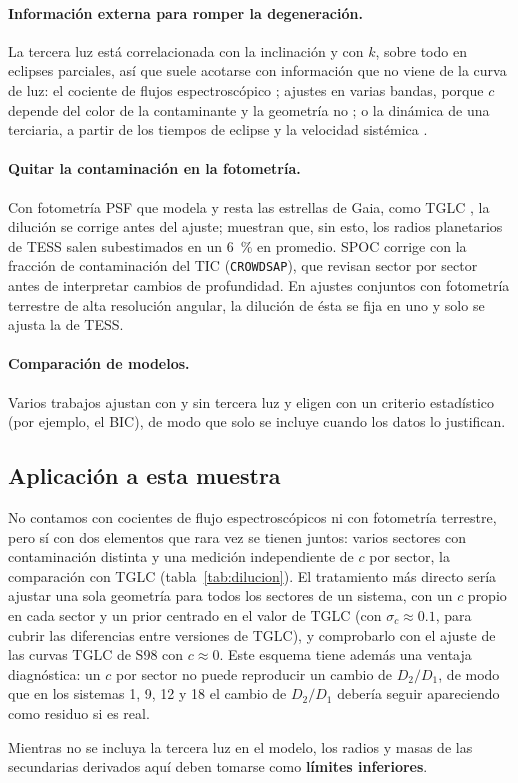 \paragraph{Información externa para romper la degeneración.} La tercera luz está correlacionada con la
inclinación y con $k$, sobre todo en eclipses parciales, así que suele acotarse con información que no viene
de la curva de luz: el cociente de flujos espectroscópico \citep{David2016}; ajustes en varias bandas, porque
$c$ depende del color de la contaminante y la geometría no \citep[en Orión,][ajustan $\ell_3$ por banda y obtienen
$\ell_3=0.31$ en TESS para nuestro sistema~6]{KounkelStassun2024}; o la dinámica de una terciaria, a partir de los
tiempos de eclipse y la velocidad sistémica \citep{GomezMaqueoChew2019}.

\paragraph{Quitar la contaminación en la fotometría.} Con fotometría PSF que modela y resta las estrellas de
Gaia, como TGLC \citep{HanBrandt2023}, la dilución se corrige antes del ajuste; \citet{Han2025} muestran que, sin
esto, los radios planetarios de TESS salen subestimados en un 6~\% en promedio. SPOC corrige con la fracción de
contaminación del TIC (\texttt{CROWDSAP}), que \citet{Baum2025} revisan sector por sector antes de interpretar
cambios de profundidad. En ajustes conjuntos con fotometría terrestre de alta resolución angular, la dilución de
ésta se fija en uno y solo se ajusta la de TESS.

\paragraph{Comparación de modelos.} Varios trabajos ajustan con y sin tercera luz y eligen con un criterio
estadístico (por ejemplo, el BIC), de modo que solo se incluye cuando los datos lo justifican.

\subsection{Aplicación a esta muestra}
No contamos con cocientes de flujo espectroscópicos ni con fotometría terrestre, pero sí con dos elementos que
rara vez se tienen juntos: varios sectores con contaminación distinta y una medición independiente de $c$ por
sector, la comparación con TGLC (tabla~\ref{tab:dilucion}). El tratamiento más directo sería ajustar una sola
geometría para todos los sectores de un sistema, con un $c$ propio en cada sector y un prior centrado en el
valor de TGLC (con $\sigma_c\approx0.1$, para cubrir las diferencias entre versiones de TGLC), y comprobarlo
con el ajuste de las curvas TGLC de S98 con $c\approx0$. Este esquema tiene además una ventaja diagnóstica:
un $c$ por sector no puede reproducir un cambio de $D_2/D_1$, de modo que en los sistemas 1, 9, 12 y 18 el
cambio de $D_2/D_1$ debería seguir apareciendo como residuo si es real.

Mientras no se incluya la tercera luz en el modelo, los radios y masas de las secundarias derivados aquí deben
tomarse como \textbf{límites inferiores}.


